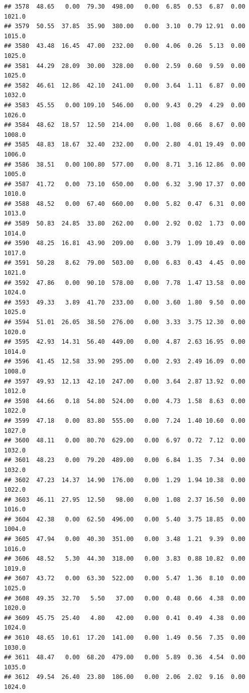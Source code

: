 \documentclass{article}\usepackage{graphicx, color}
\makeatletter
\newenvironment{kframe}{%
 \def\at@end@of@kframe{}%
 \ifinner\ifhmode%
  \def\at@end@of@kframe{\end{minipage}}%
  \begin{minipage}{\columnwidth}%
 \fi\fi%
 \def\FrameCommand##1{\hskip\@totalleftmargin \hskip-\fboxsep
 \colorbox{shadecolor}{##1}\hskip-\fboxsep
     \hskip-\linewidth \hskip-\@totalleftmargin \hskip\columnwidth}%
 \MakeFramed {\advance\hsize-\width
   \@totalleftmargin\z@ \linewidth\hsize
   \@setminipage}}%
 {\par\unskip\endMakeFramed%
 \at@end@of@kframe}
\newenvironment{knitrout}{}{} %
\makeatother
\begin{document}
\begin{knitrout}
\begin{kframe}
\begin{verbatim}
## 3578  48.65   0.00  79.30  498.00   0.00  6.85  0.53  6.87  0.00 1021.0
## 3579  50.55  37.85  35.90  380.00   0.00  3.10  0.79 12.91  0.00 1015.0
## 3580  43.48  16.45  47.00  232.00   0.00  4.06  0.26  5.13  0.00 1025.0
## 3581  44.29  28.09  30.00  328.00   0.00  2.59  0.60  9.59  0.00 1025.0
## 3582  46.61  12.86  42.10  241.00   0.00  3.64  1.11  6.87  0.00 1032.0
## 3583  45.55   0.00 109.10  546.00   0.00  9.43  0.29  4.29  0.00 1026.0
## 3584  48.62  18.57  12.50  214.00   0.00  1.08  0.66  8.67  0.00 1008.0
## 3585  48.83  18.67  32.40  232.00   0.00  2.80  4.01 19.49  0.00 1006.0
## 3586  38.51   0.00 100.80  577.00   0.00  8.71  3.16 12.86  0.00 1005.0
## 3587  41.72   0.00  73.10  650.00   0.00  6.32  3.90 17.37  0.00 1010.0
## 3588  48.52   0.00  67.40  660.00   0.00  5.82  0.47  6.31  0.00 1013.0
## 3589  50.83  24.85  33.80  262.00   0.00  2.92  0.02  1.73  0.00 1014.0
## 3590  48.25  16.81  43.90  209.00   0.00  3.79  1.09 10.49  0.00 1017.0
## 3591  50.28   8.62  79.00  503.00   0.00  6.83  0.43  4.45  0.00 1021.0
## 3592  47.86   0.00  90.10  578.00   0.00  7.78  1.47 13.58  0.00 1024.0
## 3593  49.33   3.89  41.70  233.00   0.00  3.60  1.80  9.50  0.00 1025.0
## 3594  51.01  26.05  38.50  276.00   0.00  3.33  3.75 12.30  0.00 1020.0
## 3595  42.93  14.31  56.40  449.00   0.00  4.87  2.63 16.95  0.00 1014.0
## 3596  41.45  12.58  33.90  295.00   0.00  2.93  2.49 16.09  0.00 1008.0
## 3597  49.93  12.13  42.10  247.00   0.00  3.64  2.87 13.92  0.00 1012.0
## 3598  44.66   0.18  54.80  524.00   0.00  4.73  1.58  8.63  0.00 1022.0
## 3599  47.18   0.00  83.80  555.00   0.00  7.24  1.40 10.60  0.00 1027.0
## 3600  48.11   0.00  80.70  629.00   0.00  6.97  0.72  7.12  0.00 1032.0
## 3601  48.23   0.00  79.20  489.00   0.00  6.84  1.35  7.34  0.00 1032.0
## 3602  47.23  14.37  14.90  176.00   0.00  1.29  1.94 10.38  0.00 1022.0
## 3603  46.11  27.95  12.50   98.00   0.00  1.08  2.37 16.50  0.00 1016.0
## 3604  42.38   0.00  62.50  496.00   0.00  5.40  3.75 18.85  0.00 1004.0
## 3605  47.94   0.00  40.30  351.00   0.00  3.48  1.21  9.39  0.00 1016.0
## 3606  48.52   5.30  44.30  318.00   0.00  3.83  0.88 10.82  0.00 1019.0
## 3607  43.72   0.00  63.30  522.00   0.00  5.47  1.36  8.10  0.00 1025.0
## 3608  49.35  32.70   5.50   37.00   0.00  0.48  0.66  4.38  0.00 1020.0
## 3609  45.75  25.40   4.80   42.00   0.00  0.41  0.49  4.38  0.00 1024.0
## 3610  48.65  10.61  17.20  141.00   0.00  1.49  0.56  7.35  0.00 1030.0
## 3611  48.47   0.00  68.20  479.00   0.00  5.89  0.36  4.54  0.00 1035.0
## 3612  49.54  26.40  23.80  186.00   0.00  2.06  2.02  9.16  0.00 1024.0

\end{verbatim}
\end{kframe}
\end{knitrout}
\end{document}
